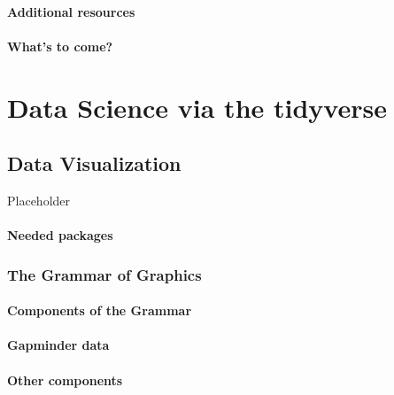 \documentclass[12pt, krantz2,]{krantz}
\begin{document}
\hypertarget{additional-resources}{%
\subsection{Additional resources}\label{additional-resources}}

\hypertarget{whats-to-come}{%
\subsection{What's to come?}\label{whats-to-come}}

\hypertarget{part-data-science-via-the-tidyverse}{%
\part{Data Science via the tidyverse}\label{part-data-science-via-the-tidyverse}}

\hypertarget{viz}{%
\chapter{Data Visualization}\label{viz}}

Placeholder

\hypertarget{needed-packages}{%
\subsection*{Needed packages}\label{needed-packages}}


\hypertarget{grammarofgraphics}{%
\section{The Grammar of Graphics}\label{grammarofgraphics}}

\hypertarget{components-of-the-grammar}{%
\subsection{Components of the Grammar}\label{components-of-the-grammar}}

\hypertarget{gapminder}{%
\subsection{Gapminder data}\label{gapminder}}

\hypertarget{other-components}{%
\subsection{Other components}\label{other-components}}
\end{document}
